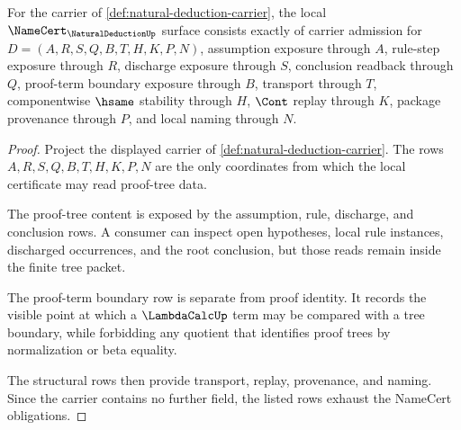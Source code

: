 \begin{theorem}
\label{thm:natural-deduction-namecert-obligations}
For the carrier of \autoref{def:natural-deduction-carrier}, the local $\NameCert_{\NaturalDeductionUp}$ surface consists exactly of carrier admission for $D=(A,R,S,Q,B,T,H,K,P,N)$, assumption exposure through $A$, rule-step exposure through $R$, discharge exposure through $S$, conclusion readback through $Q$, proof-term boundary exposure through $B$, transport through $T$, componentwise $\hsame$ stability through $H$, $\Cont$ replay through $K$, package provenance through $P$, and local naming through $N$.
\end{theorem}
\begin{proof}
Project the displayed carrier of \autoref{def:natural-deduction-carrier}. The rows $A,R,S,Q,B,T,H,K,P,N$ are the only coordinates from which the local certificate may read proof-tree data.

The proof-tree content is exposed by the assumption, rule, discharge, and conclusion rows. A consumer can inspect open hypotheses, local rule instances, discharged occurrences, and the root conclusion, but those reads remain inside the finite tree packet.

The proof-term boundary row is separate from proof identity. It records the visible point at which a $\LambdaCalcUp$ term may be compared with a tree boundary, while forbidding any quotient that identifies proof trees by normalization or beta equality.

The structural rows then provide transport, replay, provenance, and naming. Since the carrier contains no further field, the listed rows exhaust the NameCert obligations.
\end{proof}

